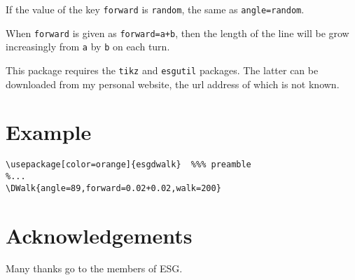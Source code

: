 \documentclass[nokorean]{oblivoir}
\begin{document}
If the value of the key \texttt{forward} is \verb|random|, the same as \verb|angle=random|.

When \texttt{forward} is given as \verb|forward=a+b|, then the length of the line
will be grow increasingly from \verb|a| by \verb|b| on each turn.

This package requires the \verb|tikz| and \verb|esgutil| packages. The latter
can be downloaded from my personal website, the url address of which is not known.

\section{Example}

\begin{verbatim}
\usepackage[color=orange]{esgdwalk}  %%% preamble
%...
\DWalk{angle=89,forward=0.02+0.02,walk=200}
\end{verbatim}


\section{Acknowledgements}

Many thanks go to the members of ESG.
\end{document}
